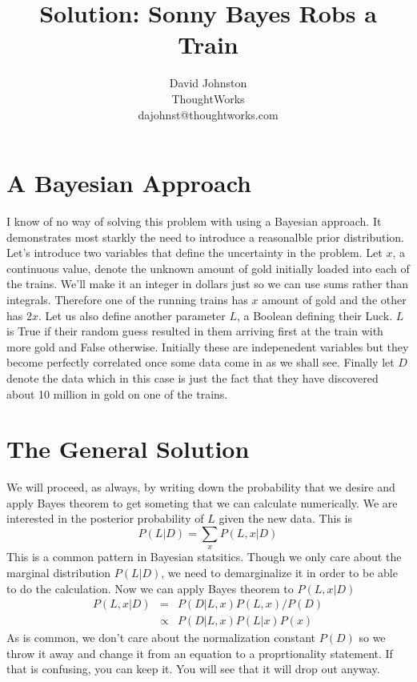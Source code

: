 \documentclass[12pt]{article}
\begin{document}
\title{Solution: Sonny Bayes Robs a Train} 
\author{David Johnston \\ThoughtWorks\\dajohnst@thoughtworks.com}
\maketitle

\section{A Bayesian Approach}

I know of no way of solving this problem with using a Bayesian approach. It demonstrates most
starkly the need to introduce a reasonalble prior distribution. Let's introduce two variables that
define the uncertainty in the problem. Let $x$, a continuous value, denote the unknown amount of gold initially 
loaded into each of the trains. We'll make it an integer in dollars just so we can use sums rather than integrals. 
Therefore one of the running trains has $x$ amount of gold and the other has $2x$. 
Let us also define another parameter $L$, a Boolean defining their Luck. $L$ is True if their random guess resulted
in them arriving first at the train with more gold and False otherwise. Initially these are indepenedent variables
but they become perfectly correlated once some data come in as we shall see. Finally let $D$ denote the data which
in this case is just the fact that they have discovered about 10 million in gold on one of the trains. 

\section{The General Solution}

We will proceed, as always, by writing down the probability that we desire and apply Bayes theorem to get someting that
we can calculate numerically. We are interested in the posterior probability of $L$ given the new data. This is
\begin{equation}
P(L | D) = \sum_x P(L, x | D)
\end{equation}
This is a common pattern in Bayesian statsitics. Though we only care about the marginal distribution $P(L | D)$, we
need to demarginalize it in order to be able to do the calculation. Now we can apply Bayes theorem to $P(L,x | D)$
\begin{eqnarray}
P(L, x | D) &=& P(D | L, x) P(L,x) / P(D)\\
&\propto& P(D | L, x) P(L|x) P(x)
\end{eqnarray}
As is common, we don't care about the normalization constant $P(D)$ so we throw it away and change it from an equation to 
a proprtionality statement. If that is confusing, you can keep it. You will see that it will drop out anyway. 
\end{document}
